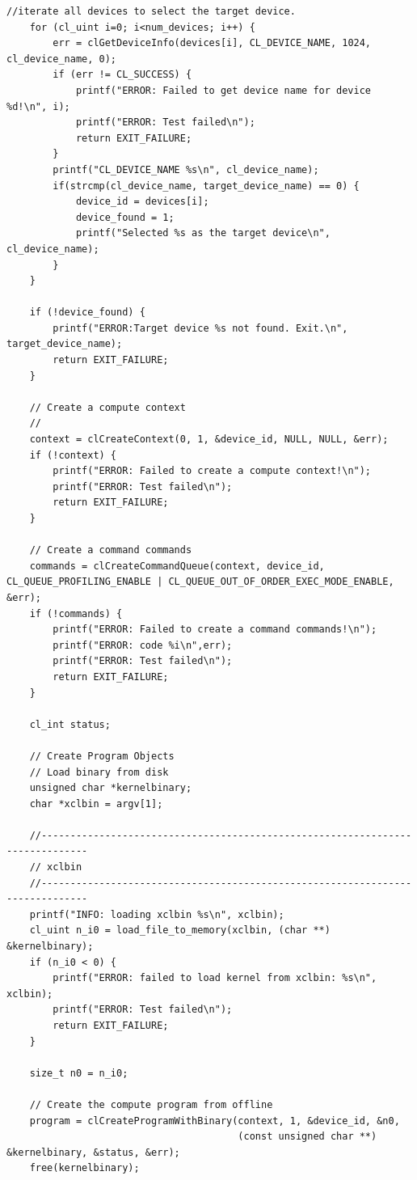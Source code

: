 \begin{lstlisting}[label=code, basicstyle=\tiny, caption=Листинг файла host\_example.cpp]
    //iterate all devices to select the target device.
    for (cl_uint i=0; i<num_devices; i++) {
        err = clGetDeviceInfo(devices[i], CL_DEVICE_NAME, 1024, cl_device_name, 0);
        if (err != CL_SUCCESS) {
            printf("ERROR: Failed to get device name for device %d!\n", i);
            printf("ERROR: Test failed\n");
            return EXIT_FAILURE;
        }
        printf("CL_DEVICE_NAME %s\n", cl_device_name);
        if(strcmp(cl_device_name, target_device_name) == 0) {
            device_id = devices[i];
            device_found = 1;
            printf("Selected %s as the target device\n", cl_device_name);
        }
    }

    if (!device_found) {
        printf("ERROR:Target device %s not found. Exit.\n", target_device_name);
        return EXIT_FAILURE;
    }

    // Create a compute context
    //
    context = clCreateContext(0, 1, &device_id, NULL, NULL, &err);
    if (!context) {
        printf("ERROR: Failed to create a compute context!\n");
        printf("ERROR: Test failed\n");
        return EXIT_FAILURE;
    }

    // Create a command commands
    commands = clCreateCommandQueue(context, device_id, CL_QUEUE_PROFILING_ENABLE | CL_QUEUE_OUT_OF_ORDER_EXEC_MODE_ENABLE, &err);
    if (!commands) {
        printf("ERROR: Failed to create a command commands!\n");
        printf("ERROR: code %i\n",err);
        printf("ERROR: Test failed\n");
        return EXIT_FAILURE;
    }

    cl_int status;

    // Create Program Objects
    // Load binary from disk
    unsigned char *kernelbinary;
    char *xclbin = argv[1];

    //------------------------------------------------------------------------------
    // xclbin
    //------------------------------------------------------------------------------
    printf("INFO: loading xclbin %s\n", xclbin);
    cl_uint n_i0 = load_file_to_memory(xclbin, (char **) &kernelbinary);
    if (n_i0 < 0) {
        printf("ERROR: failed to load kernel from xclbin: %s\n", xclbin);
        printf("ERROR: Test failed\n");
        return EXIT_FAILURE;
    }

    size_t n0 = n_i0;

    // Create the compute program from offline
    program = clCreateProgramWithBinary(context, 1, &device_id, &n0,
                                        (const unsigned char **) &kernelbinary, &status, &err);
    free(kernelbinary);


\end{lstlisting}
